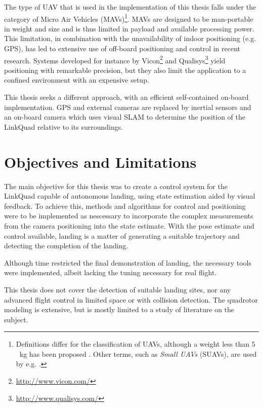     The type of UAV that is used in the implementation of this thesis
    falls under the category of Micro Air Vehicles (MAVs)\footnote{Definitions differ for the classification of UAVs,
    although a weight less than $5$~kg has been proposed \citep{arjomandi:classification}.
    Other terms, such as \textit{Small UAVs} (SUAVs), are used by e.g. \citep{valavanis2007advances}.}.
    MAVs are designed to be man-portable in weight and size and is thus
    limited in payload and available processing power.
    This limitation, in combination with the unavailability of indoor positioning (e.g. GPS),
    has led to extensive use of off-board positioning and control in recent research.
    Systems developed for instance by Vicon\footnote{\url{http://www.vicon.com/}} and
    Qualisys\footnote{\url{http://www.qualisys.com/}} yield positioning with
    remarkable precision, but they also limit the application to a confined
    environment with an expensive setup.

    This thesis seeks a different approach, with an efficient self-contained
    on-board implementation. GPS and external cameras are replaced by inertial sensors and an
    on-board camera which uses visual SLAM to determine the position of the LinkQuad relative to
    its surroundings.








\section{Objectives and Limitations}
    The main objective for this thesis was to create a control system
    for the LinkQuad capable of autonomous landing, using state estimation
    aided by visual feedback.
    To achieve this, methods and algorithms for control and positioning
    were to be implemented as nescessary to incorporate the complex measurements
    from the camera positioning into the state estimate.
    With the pose estimate and control available, landing is a matter of generating
    a suitable trajectory and detecting the completion of the landing.

    Although time restricted the final demonstration of landing, the necessary tools
    were implemented, albeit lacking the tuning necessary for real flight.

    This thesis does not cover the detection of suitable landing sites,
    nor any advanced flight control in limited space or with collision detection.
    The quadrotor modeling is extensive, but is mostly limited to a study
    of literature on the subject.

